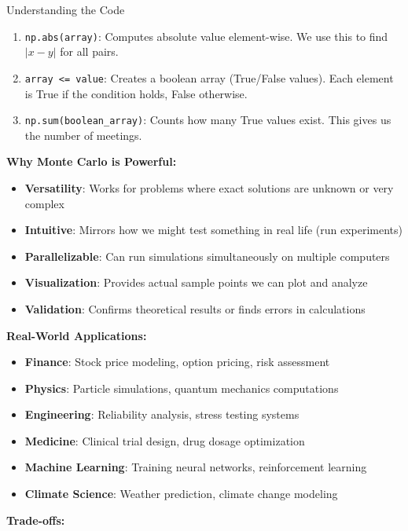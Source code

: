 \begin{itemize}
\begin{keyconceptboxbreak}{Understanding the Code}
\begin{enumerate}
    \item \texttt{np.abs(array)}: Computes absolute value element-wise. We use this to find $|x - y|$ for all pairs.

    \item \texttt{array <= value}: Creates a boolean array (True/False values). Each element is True if the condition holds, False otherwise.

    \item \texttt{np.sum(boolean\_array)}: Counts how many True values exist. This gives us the number of meetings.
\end{enumerate}

\textbf{Why Monte Carlo is Powerful:}

\begin{itemize}
    \item \textbf{Versatility}: Works for problems where exact solutions are unknown or very complex
    \item \textbf{Intuitive}: Mirrors how we might test something in real life (run experiments)
    \item \textbf{Parallelizable}: Can run simulations simultaneously on multiple computers
    \item \textbf{Visualization}: Provides actual sample points we can plot and analyze
    \item \textbf{Validation}: Confirms theoretical results or finds errors in calculations
\end{itemize}

\textbf{Real-World Applications:}

\begin{itemize}
    \item \textbf{Finance}: Stock price modeling, option pricing, risk assessment
    \item \textbf{Physics}: Particle simulations, quantum mechanics computations
    \item \textbf{Engineering}: Reliability analysis, stress testing systems
    \item \textbf{Medicine}: Clinical trial design, drug dosage optimization
    \item \textbf{Machine Learning}: Training neural networks, reinforcement learning
    \item \textbf{Climate Science}: Weather prediction, climate change modeling
\end{itemize}

\textbf{Trade-offs:}


\end{keyconceptboxbreak}
\end{itemize}
